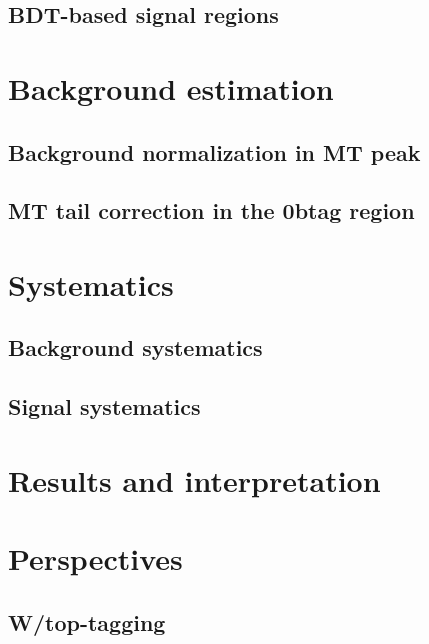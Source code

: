         \subsection{BDT-based signal regions}
        
            \loremipsum

    \section{Background estimation \label{sec:analysis_backgroundEstimation}}

        
        \loremipsum

        \subsection{Background normalization in MT peak}
        \loremipsum

        \subsection{MT tail correction in the 0btag region}
        \loremipsum

    \section{Systematics \label{sec:analysis_systematics}}
        \loremipsum

        \subsection{Background systematics}
        \loremipsum

        \subsection{Signal systematics}
        \loremipsum

    \section{Results and interpretation \label{sec:analysis_results}}
        \loremipsum

    \section{Perspectives \label{sec:analysis_perspective}}
        \loremipsum
        \subsection{W/top-tagging}
        \loremipsum
